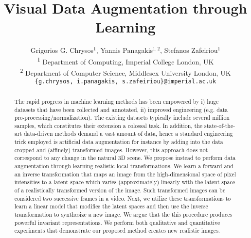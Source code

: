 \documentclass[10pt,twocolumn,letterpaper]{article}
\begin{document}
%
\title{Visual Data Augmentation through Learning}

%
%
%
%
%
%
%
%
%
%
%
%
%
%
%
\author{
Grigorios G. Chrysos$^{1}$, \quad Yannis Panagakis$^{1,2}$, \quad Stefanos Zafeiriou$^{1}$ \\ 
{\textsuperscript{1} Department of Computing, Imperial College London, UK}\\
{\textsuperscript{2} Department of Computer Science, Middlesex University London, UK}\\
%
{\texttt{\{g.chrysos, i.panagakis, s.zafeiriou\}@imperial.ac.uk}}
}

\maketitle
%

\begin{abstract}
  The rapid progress in machine learning methods has been empowered by i) huge datasets that have been collected and annotated, ii) improved engineering (e.g. data pre-processing/normalization). The existing datasets typically include several million samples, which constitutes their extension a colossal task. In addition, the state-of-the-art data-driven methods demand a vast amount of data, hence a standard engineering trick employed is artificial data augmentation
  for instance by adding into the data cropped and  (affinely) transformed images. However, this approach does not correspond to any change in the natural 3D scene.
  We propose instead to perform data augmentation through learning realistic local transformations. We learn a forward and an inverse transformation that maps an image from the high-dimensional space of pixel intensities to a latent space
  which varies (approximately) linearly with the latent space of a realistically transformed version of the image. Such transformed images can be considered two successive frames in a video. Next,
   we utilize these transformations to learn a linear model that modifies the latent spaces and then use the inverse transformation to synthesize a new image. We argue that the this procedure produces powerful invariant representations. We perform both qualitative and quantitative experiments that demonstrate our proposed method creates new realistic images.
\end{abstract}
\end{document}
